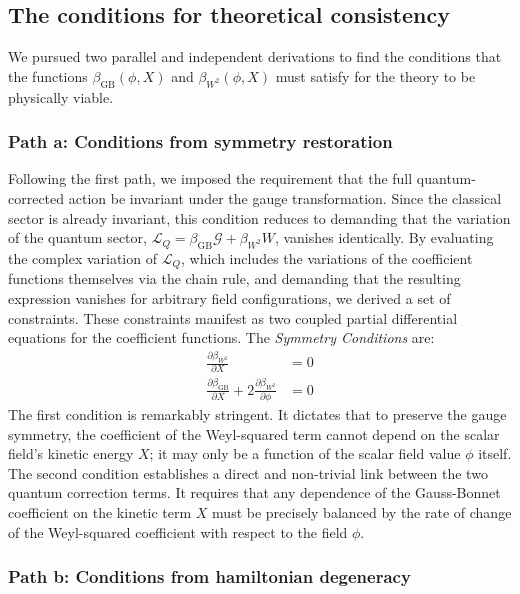 \documentclass[twocolumn]{aastex631}
\begin{document}
\subsection{The conditions for theoretical consistency}

We pursued two parallel and independent derivations to find the conditions that the functions $\beta_{\text{GB}}(\phi, X)$ and $\beta_{W^2}(\phi, X)$ must satisfy for the theory to be physically viable.

\subsubsection{Path a: Conditions from symmetry restoration}

Following the first path, we imposed the requirement that the full quantum-corrected action be invariant under the gauge transformation. Since the classical sector is already invariant, this condition reduces to demanding that the variation of the quantum sector, $\mathcal{L}_Q = \beta_{\text{GB}}\mathcal{G} + \beta_{W^2}W$, vanishes identically. By evaluating the complex variation of $\mathcal{L}_Q$, which includes the variations of the coefficient functions themselves via the chain rule, and demanding that the resulting expression vanishes for arbitrary field configurations, we derived a set of constraints. These constraints manifest as two coupled partial differential equations for the coefficient functions. The \textit{Symmetry Conditions} are:
\begin{align}
    \frac{\partial\beta_{W^2}}{\partial X} &= 0 \label{eq:sym_cond1} \\
    \frac{\partial\beta_{\text{GB}}}{\partial X} + 2 \frac{\partial\beta_{W^2}}{\partial\phi} &= 0 \label{eq:sym_cond2}
\end{align}
The first condition is remarkably stringent. It dictates that to preserve the gauge symmetry, the coefficient of the Weyl-squared term cannot depend on the scalar field's kinetic energy $X$; it may only be a function of the scalar field value $\phi$ itself. The second condition establishes a direct and non-trivial link between the two quantum correction terms. It requires that any dependence of the Gauss-Bonnet coefficient on the kinetic term $X$ must be precisely balanced by the rate of change of the Weyl-squared coefficient with respect to the field $\phi$.

\subsubsection{Path b: Conditions from hamiltonian degeneracy}
\end{document}
